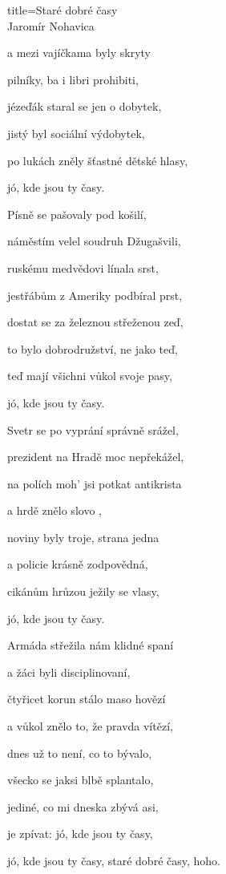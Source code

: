 \begin{song}{title=\predtitle \centering Staré dobré časy \\\large Jaromír Nohavica }
\begin{centerjustified}
a mezi vajíčkama byly skryty

pilníky, ba i libri prohibiti,

jézeďák staral se jen o dobytek,

jistý byl sociální výdobytek,

po lukách zněly šťastné dětské hlasy,

jó, kde jsou ty časy.

\sloka
Písně se pašovaly pod košilí,

náměstím velel soudruh Džugašvili,

ruskému medvědovi línala srst,

jestřábům z Ameriky podbíral prst,

dostat se za železnou střeženou zeď,

to bylo dobrodružství, ne jako teď,

teď mají všichni vůkol svoje pasy,

jó, kde jsou ty časy.

\sloka
Svetr se po vyprání správně srážel,

prezident na Hradě moc nepřekážel,

na polích moh' jsi potkat antikrista

a hrdě znělo slovo ,

noviny byly troje, strana jedna

a policie krásně zodpovědná,

cikánům hrůzou ježily se vlasy,

jó, kde jsou ty časy.

\sloka
Armáda střežila nám klidné spaní

a žáci byli disciplinovaní,

čtyřicet korun stálo maso hovězí

a vůkol znělo to, že pravda vítězí,

dnes už to není, co to bývalo,

všecko se jaksi blbě splantalo,

jediné, co mi dneska zbývá asi,

je zpívat: jó, kde jsou ty časy,

jó, kde jsou ty časy, staré dobré časy,  hoho.


\end{centerjustified}
\setcounter{Slokočet}{0}
\end{song}
